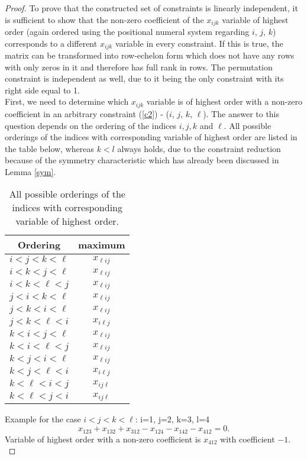 \begin{proof}
	To prove that the constructed set of constraints is linearly independent, it is sufficient to show that the non-zero coefficient of the $x_{ijk}$ variable of highest order (again ordered using the positional numeral system regarding $i$, $j$, $k$) corresponds to a different $x_{ijk}$ variable in every constraint. If this is true, the matrix can be transformed into row-echelon form which does not have any rows with only zeros in it and therefore has full rank in rows. The permutation constraint is independent as well, due to it being the only constraint with its right side equal to 1.\\
	
	First, we need to determine which $x_{ijk}$ variable is of highest order with a non-zero coefficient in an arbitrary constraint (\ref{c2}) - ($i$, $j$, $k$, $\ell$). The answer to this question depends on the ordering of the indices $i, j, k$ and $\ell$. All possible orderings of the indices with corresponding variable of highest order are listed in the table below, whereas $k<l$ always holds, due to the constraint reduction because of the symmetry characteristic which has already been discussed in Lemma \ref{sym}.\\

\begin{table}[h]
	\centering
		\begin{tabular}{||c | c ||} 
			\hline
			Ordering & maximum \\ [0.5ex] 
			\hline\hline
			$i<j<k<\ell$ & $x_{\ell ij}$ \\ 
			\hline
			$i<k<j<\ell$ & $x_{\ell ij}$ \\ 
			\hline
			$i<k<\ell<j$ & $x_{\ell ij}$ \\ 
			\hline
			$j<i<k<\ell$ & $x_{\ell ij}$ \\ 
			\hline
			$j<k<i<\ell$ & $x_{\ell ij}$ \\ 
			\hline
			$j<k<\ell<i$ & $x_{i\ell j}$ \\ 
			\hline
			$k<i<j<\ell$ & $x_{\ell ij}$ \\ 
			\hline
			$k<i<\ell<j$ & $x_{\ell ij}$ \\ 
			\hline
			$k<j<i<\ell$ & $x_{\ell ij}$ \\ 
			\hline
			$k<j<\ell<i$ & $x_{i\ell j}$ \\ 
			\hline
			$k<\ell<i<j$ & $x_{ij\ell}$ \\ 
			\hline
			$k<\ell<j<i$ & $x_{ij\ell}$ \\ 
			\hline
		\end{tabular}
	\caption{All possible orderings of the indices with corresponding variable of highest order.}
\end{table}
	\newpage
	Example for the  case $i<j<k<\ell$: i=1, j=2, k=3, l=4
	\begin{equation*}
	x_{123} + x_{132} + x_{312} - x_{124} - x_{142} - x_{412} = 0.
	\end{equation*}
	Variable of highest order with a non-zero coefficient is $x_{412}$ with coefficient $-1$. \\


\end{proof}
